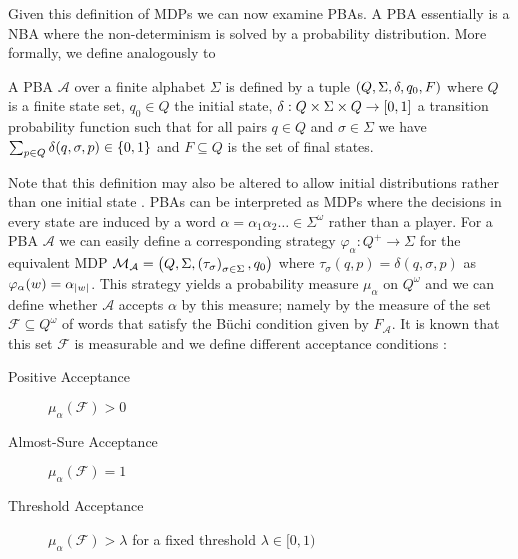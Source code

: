 Given this definition of \acp{MDP} we can now examine \acp{PBA}. A \ac{PBA}
essentially is a \ac{NBA} where the non-determinism is solved by a probability
distribution. More formally, we define analogously to \cite{Groesser}
\begin{definition}
  A \acl{PBA} $\mathcal{A}$ over a finite alphabet $\Sigma$ is defined by a
  tuple $\left(Q, \Sigma, \delta, q_{0}, F\right)$ where $Q$ is a finite state set,
  $q_{0}\in Q$ the initial state,
    $\delta:Q\times\Sigma\times Q\rightarrow \left[0,1\right]$
  a transition probability function such that for all pairs $q\in Q$ and
  $\sigma\in\Sigma$ we have $\sum_{p\in Q}\delta(q,\sigma,p)\in\left\{0,1\right\}$
  and $F\subseteq Q$ is the set of final states.
\end{definition}
Note that this definition may also be altered to allow initial distributions
rather than one initial state \cite{RecOmeLangProbAuto}.
\acp{PBA} can be interpreted as \acp{MDP} where the decisions in every state
are induced by a word $\alpha = \alpha_{1}\alpha_{2}\dots\in\Sigma^{\omega}$
rather than a player. For a \ac{PBA} $\mathcal{A}$ we can easily define a
corresponding strategy $\varphi_{\alpha}:Q^{+}\rightarrow\Sigma$ for the
equivalent \ac{MDP} $\mathcal{M}_{\mathcal{A}} =
   \left(Q, \Sigma, \left(\tau_{\sigma}\right)_{\sigma\in\Sigma}, q_{0}\right)$
where $\tau_{\sigma}(q,p) = \delta(q,\sigma,p)$ as
$\varphi_{\alpha}(w) = \alpha_{\left\vert{w}\right\vert}$. This strategy yields a probability
measure $\mu_{\alpha}$ on $Q^{\omega}$ and we can define whether $\mathcal{A}$ 
accepts $\alpha$ by this measure; namely by the measure of the set
$\mathcal{F}\subseteq Q^{\omega}$ of words that satisfy the Büchi condition
given by $F_{\mathcal{A}}$. It is known that this set $\mathcal{F}$ is
measurable and we define different acceptance conditions \cite{Groesser}:
\begin{description}
  \item [Positive Acceptance] $\mu_{\alpha}(\mathcal{F}) > 0$
  \item [Almost-Sure Acceptance] $\mu_{\alpha}(\mathcal{F}) = 1$
  \item [Threshold Acceptance] $\mu_{\alpha}(\mathcal{F}) > \lambda$ for a
    fixed threshold $\lambda\in[0, 1)$
\end{description}

